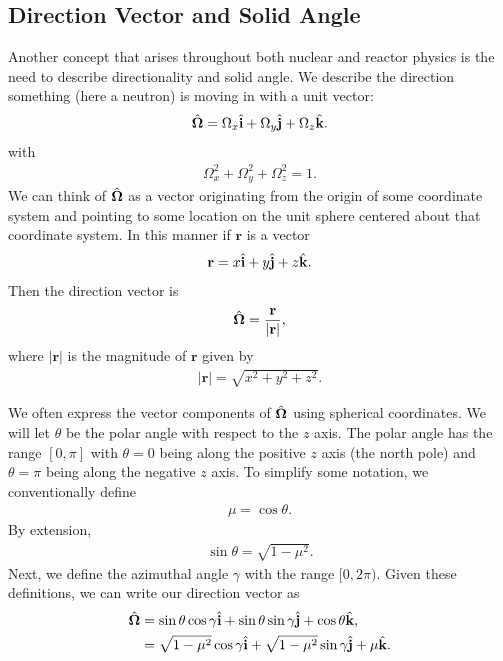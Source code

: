 \subsection{Direction Vector and Solid Angle}

Another concept that arises throughout both nuclear and reactor physics is the need to describe directionality and solid angle. We describe the direction something (here a neutron) is moving in with a unit vector:
\begin{align}
  \hat{\mathbf{\Omega}} = \Omega_x \hat{\mathbf{i}} + \Omega_y \hat{\mathbf{j}} + \Omega_z \hat{\mathbf{k}} .
\end{align}
with
\begin{align}
  \Omega_x^2 + \Omega_y^2 + \Omega_z^2 = 1. \nonumber
\end{align}
We can think of $\hat{\mathbf{\Omega}}$ as a vector originating from the origin of some coordinate system and pointing to some location on the unit sphere centered about that coordinate system. In this manner if $\mathbf{r}$ is a vector
\begin{align}
  \mathbf{r} = x \hat{\mathbf{i}} + y \hat{\mathbf{j}} + z \hat{\mathbf{k}} .
\end{align}
Then the direction vector is
\begin{align}
  \hat{\mathbf{\Omega}} = \frac{ \mathbf{r} }{ | \mathbf{r} | },
\end{align}
where $| \mathbf{r} |$ is the magnitude of $\mathbf{r}$ given by
\begin{align}
  | \mathbf{r} | = \sqrt{ x^2 + y^2 + z^2 } .
\end{align}

We often express the vector components of $\hat{\mathbf{\Omega}}$ using spherical coordinates. We will let $\theta$ be the polar angle with respect to the $z$ axis. The polar angle has the range $[0,\pi]$ with $\theta = 0$ being along the positive $z$ axis (the north pole) and $\theta = \pi$ being along the negative $z$ axis. To simplify some notation, we conventionally define
\begin{align}
  \mu = \cos\theta .
\end{align}
By extension,
\begin{align}
  \sin\theta = \sqrt{ 1 - \mu^2 } . 
\end{align}
Next, we define the azimuthal angle $\gamma$ with the range $[0,2\pi)$. Given these definitions, we can write our direction vector as
\begin{align}
  \hat{\mathbf{\Omega}} 	&= \sin\theta \cos\gamma \hat{\mathbf{i}} + \sin\theta \sin\gamma \hat{\mathbf{j}} + \cos\theta \hat{\mathbf{k}}, \nonumber \\*
  		&= \sqrt{ 1 - \mu^2 } \cos\gamma \hat{\mathbf{i}} + \sqrt{ 1 - \mu^2 }  \sin\gamma \hat{\mathbf{j}} + \mu \hat{\mathbf{k}} .
\end{align}

